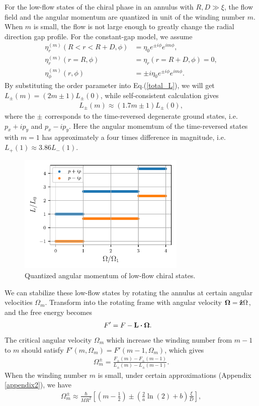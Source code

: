 \documentclass[aps,prb,reprint,groupedaddress]{revtex4-2}
\begin{document}
For the low-flow states of the chiral phase in an annulus with $R,D\gg \xi$,
the flow field and the angular momentum are quantized in unit of the winding
number $m$. When $m$ is small, the flow is not large enough to greatly change
the radial direction gap profile. For the constant-gap model, we assume
\begin{align}
    \eta_r^{(m)}(R<r<R+D,\phi) & =\eta_0 e^{\pm i\phi} e^{im\phi},      \\
    \eta_r^{(m)}(r=R,\phi)     & =\eta_r(r=R+D,\phi)=0,                 \\
    \eta_\phi^{(m)}(r,\phi)    & =\pm i\eta_0 e^{\pm i\phi} e^{im\phi}.
\end{align}
By substituting the order parameter into Eq.(\ref{total_L}), we will get
$L_\pm(m)=(2m\pm 1)L_\pm(0)$, while self-consistent calculation gives
\begin{align}
    L_\pm(m)\approx(1.7m\pm 1)L_\pm(0),
\end{align}
where the $\pm$ corresponds to the time-reversed degenerate ground states,
i.e. $p_x+ip_y$ and $p_x-ip_y$. Here the angular momemtum of the time-reversed
states with $m=1$ has approximately a four times difference in magnitude,
i.e. $L_+(1)\approx 3.86L_-(1)$.

\begin{figure}
    \centering
    \includegraphics[width=8cm]{L_m.pdf}
    \caption{Quantized angular momentum of low-flow chiral states.}
    \label{L_m}
\end{figure}

We can stabilize these low-flow states by rotating the annulus at
certain angular velocities $\Omega_m$. Transform into the rotating frame
with angular velocity $\vb{\Omega}=\vu{z}\Omega$, and the free energy becomes
\begin{align}
    F' & =F-\vb{L}\vdot\vb{\Omega}.
\end{align}
The critical angular velocity $\Omega_m$ which increase
the winding number from $m-1$ to $m$ should
satisfy $F'(m,\Omega_m)=F'(m-1,\Omega_m)$, which gives
\begin{align}
    \Omega_m^\pm=\frac{F_\pm(m) - F_\pm(m-1)}{L_\pm(m) - L_\pm(m-1)}.
\end{align}
When the winding number $m$ is small, under certain approximations (Appendix \ref{appendix2}),
we have
\begin{align}
    \Omega_m^\pm \approx \frac{\hbar}{MR^2}\left[\left(m-\frac{1}{2}\right)
        \pm\left(\frac{2}{a}\ln(2)+b\right)\frac{\xi}{D}\right],
\end{align}
\end{document}
